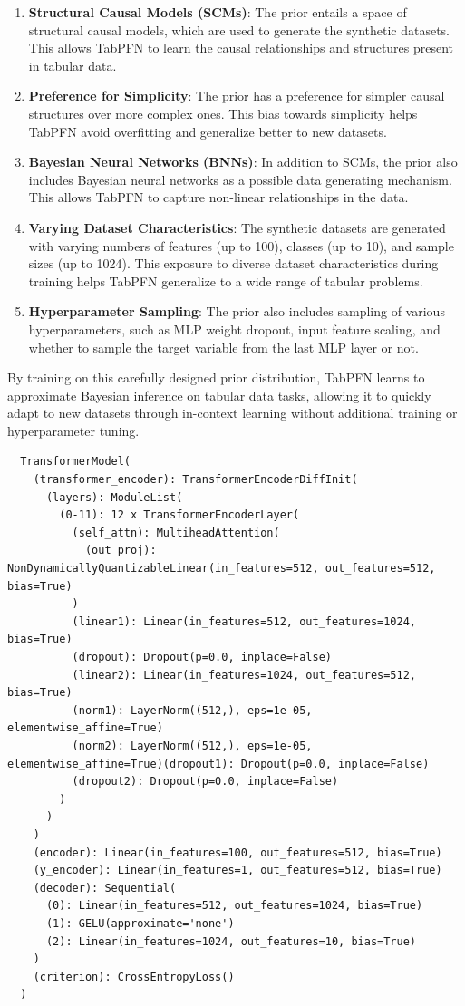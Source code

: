 \documentclass[a4paper]{article}
\begin{document}
\begin{enumerate}
  \item \textbf{Structural Causal Models (SCMs)}: The prior entails a space of structural causal models, which are used to generate the synthetic datasets. This allows TabPFN to learn the causal relationships and structures present in tabular data.
  
  \item \textbf{Preference for Simplicity}: The prior has a preference for simpler causal structures over more complex ones. This bias towards simplicity helps TabPFN avoid overfitting and generalize better to new datasets.
  
  \item \textbf{Bayesian Neural Networks (BNNs)}: In addition to SCMs, the prior also includes Bayesian neural networks as a possible data generating mechanism. This allows TabPFN to capture non-linear relationships in the data.
  
  \item \textbf{Varying Dataset Characteristics}: The synthetic datasets are generated with varying numbers of features (up to 100), classes (up to 10), and sample sizes (up to 1024). This exposure to diverse dataset characteristics during training helps TabPFN generalize to a wide range of tabular problems.
  
  \item \textbf{Hyperparameter Sampling}: The prior also includes sampling of various hyperparameters, such as MLP weight dropout, input feature scaling, and whether to sample the target variable from the last MLP layer or not.
\end{enumerate}

By training on this carefully designed prior distribution, TabPFN learns to approximate Bayesian inference on tabular data tasks, allowing it to quickly adapt to new datasets through in-context learning without additional training or hyperparameter tuning.


\begin{verbatim}
  TransformerModel(
    (transformer_encoder): TransformerEncoderDiffInit(
      (layers): ModuleList(
        (0-11): 12 x TransformerEncoderLayer(
          (self_attn): MultiheadAttention(
            (out_proj): NonDynamicallyQuantizableLinear(in_features=512, out_features=512, bias=True)
          )
          (linear1): Linear(in_features=512, out_features=1024, bias=True)
          (dropout): Dropout(p=0.0, inplace=False)
          (linear2): Linear(in_features=1024, out_features=512, bias=True)
          (norm1): LayerNorm((512,), eps=1e-05, elementwise_affine=True)
          (norm2): LayerNorm((512,), eps=1e-05, elementwise_affine=True)(dropout1): Dropout(p=0.0, inplace=False)
          (dropout2): Dropout(p=0.0, inplace=False)
        )
      )
    )
    (encoder): Linear(in_features=100, out_features=512, bias=True)
    (y_encoder): Linear(in_features=1, out_features=512, bias=True)
    (decoder): Sequential(
      (0): Linear(in_features=512, out_features=1024, bias=True)
      (1): GELU(approximate='none')
      (2): Linear(in_features=1024, out_features=10, bias=True)
    )
    (criterion): CrossEntropyLoss()
  )
  \end{verbatim}
\end{document}
